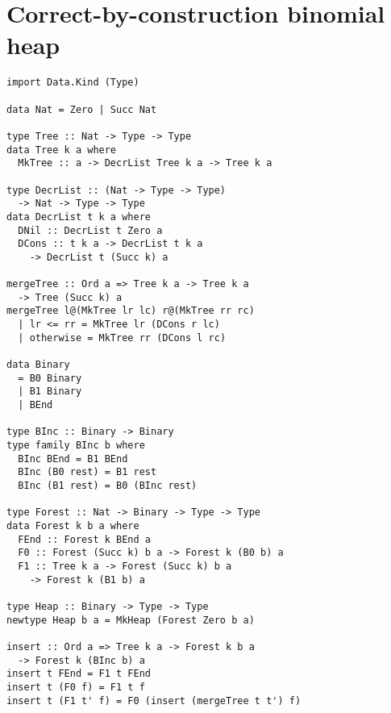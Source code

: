 \documentclass[sigplan,screen]{acmart}
\begin{document}




\appendix

\section{Correct-by-construction binomial heap}\label{app:datakinds}

\begin{lstlisting}
import Data.Kind (Type)

data Nat = Zero | Succ Nat

type Tree :: Nat -> Type -> Type
data Tree k a where
  MkTree :: a -> DecrList Tree k a -> Tree k a

type DecrList :: (Nat -> Type -> Type)
  -> Nat -> Type -> Type
data DecrList t k a where
  DNil :: DecrList t Zero a
  DCons :: t k a -> DecrList t k a
    -> DecrList t (Succ k) a

mergeTree :: Ord a => Tree k a -> Tree k a
  -> Tree (Succ k) a
mergeTree l@(MkTree lr lc) r@(MkTree rr rc)
  | lr <= rr = MkTree lr (DCons r lc)
  | otherwise = MkTree rr (DCons l rc)

data Binary
  = B0 Binary
  | B1 Binary
  | BEnd

type BInc :: Binary -> Binary
type family BInc b where
  BInc BEnd = B1 BEnd
  BInc (B0 rest) = B1 rest
  BInc (B1 rest) = B0 (BInc rest)

type Forest :: Nat -> Binary -> Type -> Type
data Forest k b a where
  FEnd :: Forest k BEnd a
  F0 :: Forest (Succ k) b a -> Forest k (B0 b) a
  F1 :: Tree k a -> Forest (Succ k) b a
    -> Forest k (B1 b) a

type Heap :: Binary -> Type -> Type
newtype Heap b a = MkHeap (Forest Zero b a)

insert :: Ord a => Tree k a -> Forest k b a
  -> Forest k (BInc b) a
insert t FEnd = F1 t FEnd
insert t (F0 f) = F1 t f
insert t (F1 t' f) = F0 (insert (mergeTree t t') f)
\end{lstlisting}
\end{document}
